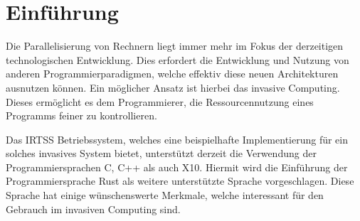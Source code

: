 \chapter{Einführung}\label{sec:intro}

Die Parallelisierung von Rechnern liegt immer mehr im Fokus der derzeitigen technologischen Entwicklung.
Dies erfordert die Entwicklung und Nutzung von anderen Programmierparadigmen, welche effektiv
diese neuen Architekturen ausnutzen können. Ein möglicher Ansatz ist hierbei das
invasive Computing. Dieses ermöglicht es dem Programmierer, die Ressourcennutzung
eines Programms feiner zu kontrollieren.

Das IRTSS Betriebssystem, welches eine beispielhafte Implementierung für ein solches
invasives System bietet, unterstützt derzeit die Verwendung der Programmiersprachen
C, C++ als auch X10. Hiermit wird die Einführung der Programmiersprache Rust als
weitere unterstützte Sprache vorgeschlagen. Diese Sprache hat einige wünschenswerte Merkmale, 
welche interessant für den Gebrauch im invasiven Computing sind.
